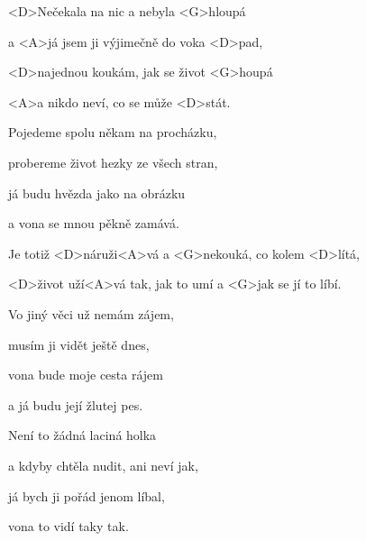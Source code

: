 

\zs
<D>Nečekala na nic a nebyla <G>hloupá

a <A>já jsem ji výjimečně do voka <D>pad,

<D>najednou koukám, jak se život <G>houpá

<A>a nikdo neví, co se může <D>stát.
\ks

\zs
Pojedeme spolu někam na procházku,

probereme život hezky ze všech stran,

já budu hvězda jako na obrázku

a vona se mnou pěkně zamává.
\ks

\zr
Je totiž <D>náruži<A>vá a <G>nekouká, co kolem <D>lítá,

<D>život uží<A>vá tak, jak to umí a <G>jak se jí to líbí.
\kr

\zs
Vo jiný věci už nemám zájem,

musím ji vidět ještě dnes,

vona bude moje cesta rájem

a já budu její žlutej pes.
\ks

\zs
Není to žádná laciná holka

a kdyby chtěla nudit, ani neví jak,

já bych ji pořád jenom líbal,

vona to vidí taky tak.
\ks

\zr \kr \zr \kr

\kp





